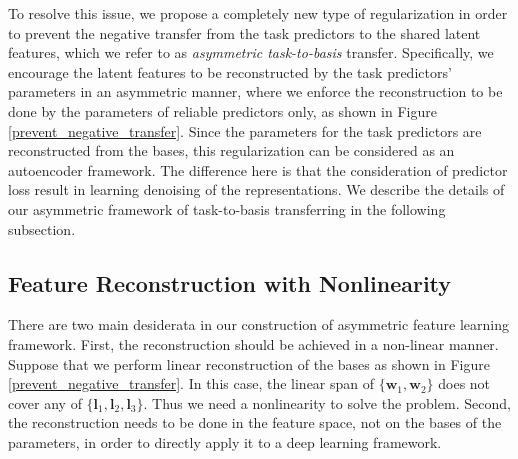 \documentclass{article}
\newcommand{\vct}[1]{\boldsymbol{#1}} %
\begin{document}
	To resolve this issue, we propose a completely new type of regularization in order to prevent the negative transfer from the task predictors to the shared latent features, which we refer to as \emph{asymmetric task-to-basis} transfer. Specifically, we encourage the latent features to be reconstructed by the task predictors' parameters in an asymmetric manner, where we enforce the reconstruction to be done by the parameters of reliable predictors only, as shown in Figure \ref{prevent_negative_transfer}. Since the parameters for the task predictors are reconstructed from the bases, this regularization can be considered as an autoencoder framework. The difference here is that the consideration of predictor loss result in learning denoising of the representations. We describe the details of our asymmetric framework of task-to-basis transferring in the following subsection.    
	
	\subsection{Feature Reconstruction with Nonlinearity}
	There are two main desiderata in our construction of asymmetric feature learning framework.  
	First, the reconstruction should be achieved in a non-linear manner. Suppose that we perform linear reconstruction of the bases as shown in Figure \ref{prevent_negative_transfer}. In this case, the linear span of $\{\vct{w}_1,\vct{w}_2\}$ does not cover any of $\{\vct{l}_1, \vct{l}_2,\vct{l}_3\}$. Thus we need a nonlinearity to solve the problem. Second, the reconstruction needs to be done in the feature space, not on the bases of the parameters, in order to directly apply it to a deep learning framework. 
	
\end{document}
